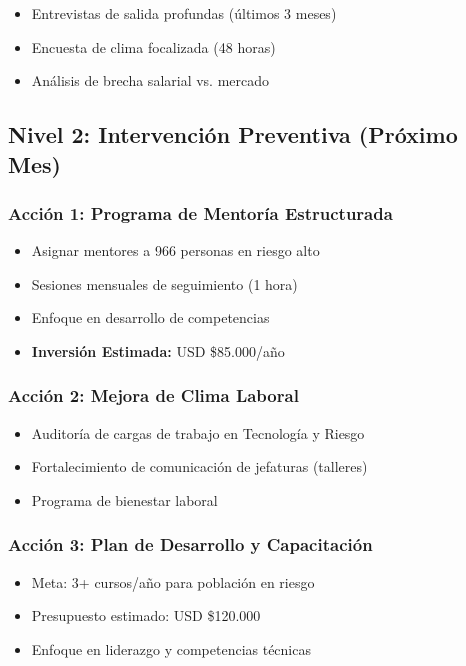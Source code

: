 \documentclass[11pt,a4paper,twoside]{article}
\begin{document}
\begin{itemize}
    \item Entrevistas de salida profundas (últimos 3 meses)
    \item Encuesta de clima focalizada (48 horas)
    \item Análisis de brecha salarial vs. mercado
\end{itemize}

\subsection{Nivel 2: Intervención Preventiva (Próximo Mes)}

\subsubsection{Acción 1: Programa de Mentoría Estructurada}

\begin{itemize}
    \item Asignar mentores a 966 personas en riesgo alto
    \item Sesiones mensuales de seguimiento (1 hora)
    \item Enfoque en desarrollo de competencias
    \item \textbf{Inversión Estimada:} USD \$85.000/año
\end{itemize}

\subsubsection{Acción 2: Mejora de Clima Laboral}

\begin{itemize}
    \item Auditoría de cargas de trabajo en Tecnología y Riesgo
    \item Fortalecimiento de comunicación de jefaturas (talleres)
    \item Programa de bienestar laboral
\end{itemize}

\subsubsection{Acción 3: Plan de Desarrollo y Capacitación}

\begin{itemize}
    \item Meta: 3+ cursos/año para población en riesgo
    \item Presupuesto estimado: USD \$120.000
    \item Enfoque en liderazgo y competencias técnicas
\end{itemize}
\end{document}

